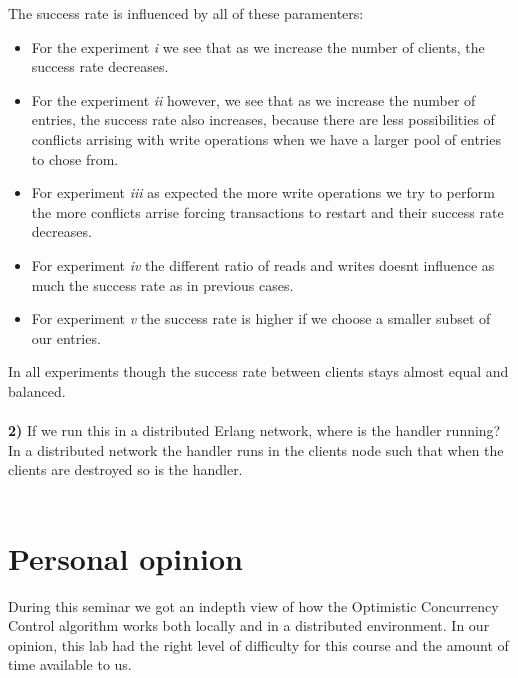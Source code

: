 \documentclass[a4paper, 11pt]{article}
\begin{document}
The success rate is influenced by all of these paramenters:\\
\begin{itemize}
\item For the experiment \textit{i} we see that as we increase the number of clients, the success rate decreases.\\
\item For the experiment \textit{ii} however, we see that as we increase the number of entries, the success rate also increases, because there are less possibilities of conflicts arrising with write operations when we have a larger pool of entries to chose from.\\
\item For experiment \textit{iii} as expected the more write operations we try to perform the more conflicts arrise forcing transactions to restart and their success rate decreases.\\
\item For experiment \textit{iv} the different ratio of reads and writes doesnt influence as much the success rate as in previous cases.\\
\item For experiment \textit{v} the success rate is higher if we choose a smaller subset of our entries.\\
\end{itemize}
In all experiments though the success rate between clients stays almost equal and balanced.\\\\
%
\textbf{2)} If we run this in a distributed Erlang network, where is the handler running?\\
In a distributed network the handler runs in the clients node such that when the clients are destroyed so is the handler.\\\\

\section{Personal opinion}
During this seminar we got an indepth view of how the Optimistic Concurrency Control algorithm works both locally and in a distributed environment. In our opinion, this lab had the right level of difficulty for this course and the amount of time available to us. \\
\end{document}
